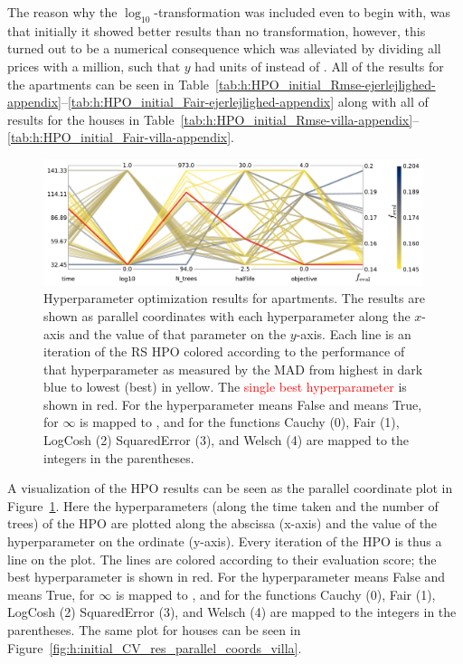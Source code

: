 The reason why the $\log_{10}$-transformation was included even to begin with, was that initially it showed better results than no transformation, however, this turned out to be a numerical consequence which was alleviated by dividing all prices with a million, such that $y$ had units of \si{\Mkr} instead of \si{\kr}. All of the results for the apartments can be seen in Table~\ref{tab:h:HPO_initial_Rmse-ejerlejlighed-appendix}--\ref{tab:h:HPO_initial_Fair-ejerlejlighed-appendix} along with all of results for the houses in Table~\ref{tab:h:HPO_initial_Rmse-villa-appendix}--\ref{tab:h:HPO_initial_Fair-villa-appendix}. 

\begin{figure}[h!]
  \centerfloat
  \includegraphics[width=0.99\textwidth, trim=0 0 0 0, clip]{figures/housing/Ejerlejlighed_v19_cut_all_Ncols_all_CV_viz_initial_HPO.pdf}
  \caption[Parallel Coordinate Plot of the Initial Hyperparameter Optimization for Apartments]
          {Hyperparameter optimization results for apartments. The results are shown as parallel coordinates with each hyperparameter along the $x$-axis and the value of that parameter on the $y$-axis. Each line is an iteration of the RS HPO colored according to the performance of that hyperparameter as measured by the MAD from \textcolor{viridis-dark}{highest} in dark blue to \textcolor{viridis-light}{lowest (best)} in yellow. The \textcolor{red}{single best hyperparameter} is shown in red. For the hyperparameter   means False and  means True, for  $\infty$ is mapped to , and for  the functions Cauchy (0), Fair (1), LogCosh (2) SquaredError (3), and Welsch (4) are mapped to the integers in the parentheses.
          } 
  \label{fig:h:initial_CV_res_parallel_coords_ejer}
\end{figure}

A visualization of the HPO results can be seen as the parallel coordinate plot in Figure~\ref{fig:h:initial_CV_res_parallel_coords_ejer}. Here the hyperparameters (along the time taken and the number of trees) of the HPO are plotted along the abscissa (x-axis) and the value of the hyperparameter on the ordinate (y-axis). Every iteration of the HPO is thus a line on the plot. The lines are colored according to their evaluation score; the best hyperparameter is shown in red. For the hyperparameter   means False and  means True, for  $\infty$ is mapped to , and for  the functions Cauchy (0), Fair (1), LogCosh (2) SquaredError (3), and Welsch (4) are mapped to the integers in the parentheses. The same plot for houses can be seen in Figure~\ref{fig:h:initial_CV_res_parallel_coords_villa}.


